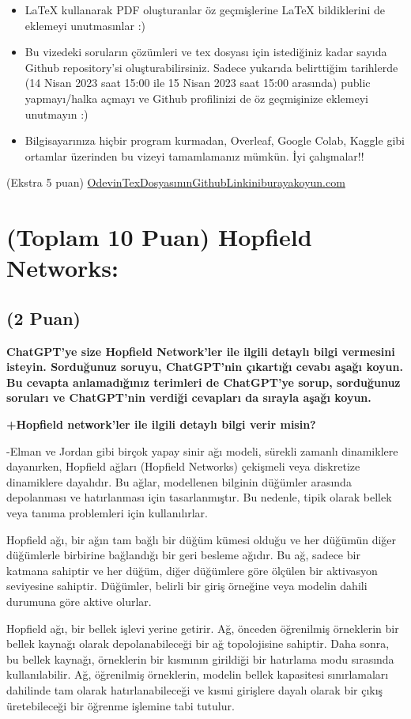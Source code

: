 \documentclass[11pt]{article}
\begin{document}
\begin{itemize}
    \item LaTeX kullanarak PDF oluşturanlar öz geçmişlerine LaTeX bildiklerini de eklemeyi unutmasınlar :)
    \item Bu vizedeki soruların çözümleri ve tex dosyası için istediğiniz kadar sayıda Github repository'si oluşturabilirsiniz. Sadece yukarıda belirttiğim tarihlerde (14 Nisan 2023 saat 15:00 ile 15 Nisan 2023 saat 15:00 arasında) public yapmayı/halka açmayı ve Github profilinizi de öz geçmişinize eklemeyi unutmayın :)
    \item Bilgisayarınıza hiçbir program kurmadan, Overleaf, Google Colab, Kaggle gibi ortamlar üzerinden bu vizeyi tamamlamanız mümkün. İyi çalışmalar!!
\end{itemize}

(Ekstra 5 puan) \url{OdevinTexDosyasınınGithubLinkiniburayakoyun.com}

\newpage
\section{(Toplam 10 Puan) Hopfield Networks:}

\subsection{(2 Puan)} \textbf{ChatGPT’ye size Hopfield Network’ler ile ilgili detaylı bilgi vermesini isteyin. Sorduğunuz soruyu, ChatGPT'nin çıkartığı cevabı aşağı koyun. Bu cevapta anlamadığınız terimleri de ChatGPT’ye sorup, sorduğunuz soruları ve ChatGPT’nin verdiği cevapları da sırayla aşağı koyun.}

  \textbf{+Hopfield network'ler ile ilgili detaylı bilgi verir misin?}
  
  -Elman ve Jordan gibi birçok yapay sinir ağı modeli, sürekli zamanlı dinamiklere dayanırken, Hopfield ağları (Hopfield Networks) çekişmeli veya diskretize dinamiklere dayalıdır. Bu ağlar, modellenen bilginin düğümler arasında depolanması ve hatırlanması için tasarlanmıştır. Bu nedenle, tipik olarak bellek veya tanıma problemleri için kullanılırlar.

Hopfield ağı, bir ağın tam bağlı bir düğüm kümesi olduğu ve her düğümün diğer düğümlerle birbirine bağlandığı bir geri besleme ağıdır. Bu ağ, sadece bir katmana sahiptir ve her düğüm, diğer düğümlere göre ölçülen bir aktivasyon seviyesine sahiptir. Düğümler, belirli bir giriş örneğine veya modelin dahili durumuna göre aktive olurlar.

Hopfield ağı, bir bellek işlevi yerine getirir. Ağ, önceden öğrenilmiş örneklerin bir bellek kaynağı olarak depolanabileceği bir ağ topolojisine sahiptir. Daha sonra, bu bellek kaynağı, örneklerin bir kısmının girildiği bir hatırlama modu sırasında kullanılabilir. Ağ, öğrenilmiş örneklerin, modelin bellek kapasitesi sınırlamaları dahilinde tam olarak hatırlanabileceği ve kısmi girişlere dayalı olarak bir çıkış üretebileceği bir öğrenme işlemine tabi tutulur.
\end{document}
